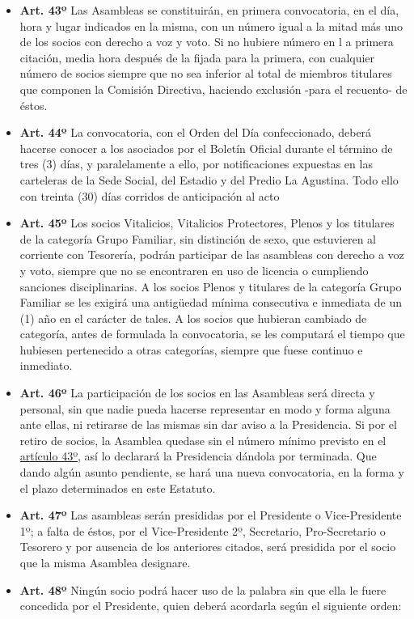 \documentclass[]{book}
\begin{document}
\begin{itemize}
\item
  \textbf{Art. 43º} Las Asambleas se constituirán, en primera
  convocatoria, en el día, hora y lugar indicados en la misma, con un
  número igual a la mitad más uno de los socios con derecho a voz y
  voto. Si no hubiere número en l a primera citación, media hora después
  de la fijada para la primera, con cualquier número de socios siempre
  que no sea inferior al total de miembros titulares que componen la
  Comisión Directiva, haciendo exclusión -para el recuento- de éstos.
\item
  \textbf{Art. 44º} La convocatoria, con el Orden del Día confeccionado,
  deberá hacerse conocer a los asociados por el Boletín Oficial durante
  el término de tres (3) días, y paralelamente a ello, por
  notificaciones expuestas en las carteleras de la Sede Social, del
  Estadio y del Predio La Agustina. Todo ello con treinta (30) días
  corridos de anticipación al acto
\item
  \textbf{Art. 45º} Los socios Vitalicios, Vitalicios Protectores,
  Plenos y los titulares de la categoría Grupo Familiar, sin distinción
  de sexo, que estuvieren al corriente con Tesorería, podrán participar
  de las asambleas con derecho a voz y voto, siempre que no se
  encontraren en uso de licencia o cumpliendo sanciones disciplinarias.
  A los socios Plenos y titulares de la categoría Grupo Familiar se les
  exigirá una antigüedad mínima consecutiva e inmediata de un (1) año en
  el carácter de tales. A los socios que hubieran cambiado de categoría,
  antes de formulada la convocatoria, se les computará el tiempo que
  hubiesen pertenecido a otras categorías, siempre que fuese continuo e
  inmediato.
\item
  \textbf{Art. 46º} La participación de los socios en las Asambleas será
  directa y personal, sin que nadie pueda hacerse representar en modo y
  forma alguna ante ellas, ni retirarse de las mismas sin dar aviso a la
  Presidencia. Si por el retiro de socios, la Asamblea quedase sin el
  número mínimo previsto en el \protect\hyperlink{art43}{artículo 43º},
  así lo declarará la Presidencia dándola por terminada. Que dando algún
  asunto pendiente, se hará una nueva convocatoria, en la forma y el
  plazo determinados en este Estatuto.
\item
  \textbf{Art. 47º} Las asambleas serán presididas por el Presidente o
  Vice-Presidente 1º; a falta de éstos, por el Vice-Presidente 2º,
  Secretario, Pro-Secretario o Tesorero y por ausencia de los anteriores
  citados, será presidida por el socio que la misma Asamblea designare.
\item
  \textbf{Art. 48º} Ningún socio podrá hacer uso de la palabra sin que
  ella le fuere concedida por el Presidente, quien deberá acordarla
  según el siguiente orden:


\end{itemize}
\end{document}
